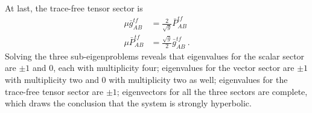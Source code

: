 At last, the trace-free tensor sector is
\begin{subequations}
\begin{align}
\mu {\bar g}^{tf}_{AB} & = \frac{2}{\sqrt{g}}{\bar P}^{tf}_{AB}\\
\mu {\bar P}^{tf}_{AB} & = \frac{\sqrt{g}}{2}{\bar g}^{tf}_{AB} \ .
\end{align}
\end{subequations}
Solving the three sub-eigenproblems reveals that eigenvalues for the scalar sector are $\pm 1$ and 0, each with multiplicity four; eigenvalues for the vector sector are $\pm 1$ with multiplicity two and 0 with multiplicity two as well; eigenvalues for the trace-free tensor sector are $\pm 1$; eigenvectors for all the three sectors are complete, which draws the conclusion that the system is strongly hyperbolic. 

